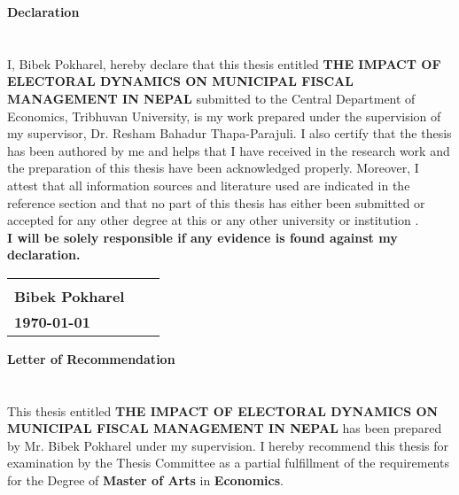 \begin{center}
\textbf{\large Declaration}
\end{center}
\section*{}


\vspace{-10mm}I, Bibek Pokharel, hereby declare that this thesis entitled \textbf{THE IMPACT OF ELECTORAL DYNAMICS ON MUNICIPAL FISCAL MANAGEMENT IN NEPAL} submitted to the Central Department of Economics, Tribhuvan University, is my work prepared under the supervision of my supervisor, Dr. Resham Bahadur Thapa-Parajuli. I also certify that the thesis has been authored by me and helps that I have received in the research work and the preparation of this thesis have been acknowledged properly. Moreover, I attest that all information sources and literature used are indicated in the reference section and that no part of this thesis has either been submitted or accepted for any other degree at this or any other university or institution .\vspace{10mm}\\ 
\textbf{I will be solely responsible if any evidence is found against my declaration.} \\

\vspace{25mm}
\noindent
\begin{tabular}{@{}p{2.5in}p{2in}p{2in}@{}}
\hrulefill \\
\textbf{Bibek Pokharel} &&\\
\textbf{\today}\\
\end{tabular}

\setcounter{page}{2}


\newpage
\begin{center}
\textbf{\large Letter of Recommendation}
\end{center}\section*{}


\vspace{-10mm}This thesis entitled \textbf{THE IMPACT OF ELECTORAL DYNAMICS ON MUNICIPAL FISCAL MANAGEMENT IN NEPAL} has been prepared by Mr. Bibek Pokharel under my supervision. I hereby recommend this thesis for examination by the Thesis Committee as a partial fulfillment of the requirements for the Degree of \textbf{Master of Arts} in \textbf{Economics}.\vspace{15mm} \\

